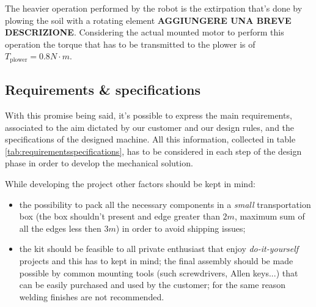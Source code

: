 	The heavier operation performed by the robot is the extirpation that's done by plowing the soil with a rotating element \textbf{AGGIUNGERE UNA BREVE DESCRIZIONE}. Considering the actual mounted motor to perform this operation the torque that has to be transmitted to the plower is of $T_\textrm{plower} = 0.8 N\cdot m$.

	
	\subsection{Requirements \& specifications}
		With this promise being said, it's possible to express the main requirements, associated to the aim dictated by our customer and our design rules, and the specifications of the designed machine. All this information, collected in table \ref{tab:requirementsspecifications}, has to be considered in each step of the design phase in order to develop the mechanical solution.
		
		
		
		While developing the project other factors should be kept in mind:
		\begin{itemize}
			\item the possibility to pack all the necessary components in a \textit{small} transportation box (the box shouldn't present and edge greater than $2m$, maximum sum of all the edges less then $3m$) in order to avoid shipping issues;
			
			\item the kit should be feasible to all private enthusiast that enjoy \textit{do-it-yourself} projects and this has to kept in mind; the final assembly should be made possible by common mounting tools (such screwdrivers, Allen keys...) that can be easily purchased and used by the customer; for the same reason welding finishes are not recommended.
		\end{itemize}
	
	
	
	
	
	
	
	
	
	
	
	
	
	
	
	
	
	
	
	
	
	
	
	
